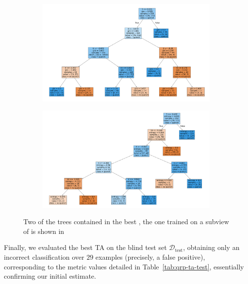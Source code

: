 \begin{figure}[!ht]
	\centering
	\begin{subfigure}{\linewidth}
		\includegraphics[width=\linewidth]{img/Bn_3_6_8_15_pt_dt.png}
	\end{subfigure}
	\begin{subfigure}{\linewidth}
		\includegraphics[width=\linewidth]{img/Cnmod_3_4_5_14_pt_dt.png}
	\end{subfigure}
	\caption{Two of the trees contained in the best \ta, the one trained on a subview of \an is
		shown in } \label{fig:part-of-bta}
\end{figure}

Finally, we evaluated the best TA on the blind test set $\mathscr D_\mathrm{test}$, obtaining only
an incorrect classification over $29$ examples (precisely, a false positive), corresponding to the
metric values detailed in Table~\ref{tab:qrp-ta-test}, essentially confirming our initial estimate.

